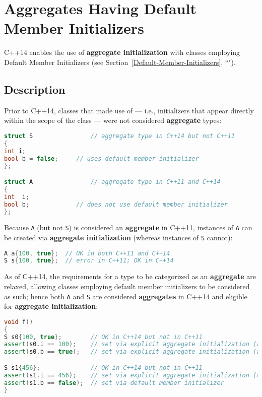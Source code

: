 \newpage
{}
\section[Aggregate Init '14]{Aggregates Having Default Member Initializers}\label{aggregate-member-initialization-relaxation}

C++14 enables the use of \textbf{aggregate initialization} with classes
employing Default Member Initializers (see Section~\ref{Default-Member-Initializers}, ``").

\subsection[Description]{Description}\label{description}

Prior to C++14, classes that made use of  --- i.e., initializers that appear directly within the
scope of the class --- were not considered \textbf{aggregate} types:

\begin{lstlisting}[language=C++]
struct S                // aggregate type in C++14 but not C++11
{
int i;
bool b = false;     // uses default member initializer
};

struct A                // aggregate type in C++11 and C++14
{
int  i;
bool b;             // does not use default member initializer
};
\end{lstlisting}

\noindent Because \texttt{A} (but not \texttt{S}) is considered an \textbf{aggregate} in
C++11, instances of \texttt{A} can be created via \textbf{aggregate
initialization} (whereas instances of \texttt{S} cannot):

\begin{lstlisting}[language=C++]
A a{100, true};  // OK in both C++11 and C++14
S s{100, true};  // error in C++11; OK in C++14
\end{lstlisting}


\noindent As of C++14, the requirements for a type to be categorized as an
\textbf{aggregate} are relaxed, allowing classes employing default
member initializers to be considered as such; hence both \texttt{A} and
\texttt{S} are considered \textbf{aggregates} in C++14 and eligible for
\textbf{aggregate initialization}:

\begin{lstlisting}[language=C++]
void f()
{
S s0{100, true};        // OK in C++14 but not in C++11
assert(s0.i == 100);    // set via explicit aggregate initialization (above)
assert(s0.b == true);   // set via explicit aggregate initialization (above)

S s1{456};              // OK in C++14 but not in C++11
assert(s1.i == 456);    // set via explicit aggregate initialization (above)
assert(s1.b == false);  // set via default member initializer
}
\end{lstlisting}

